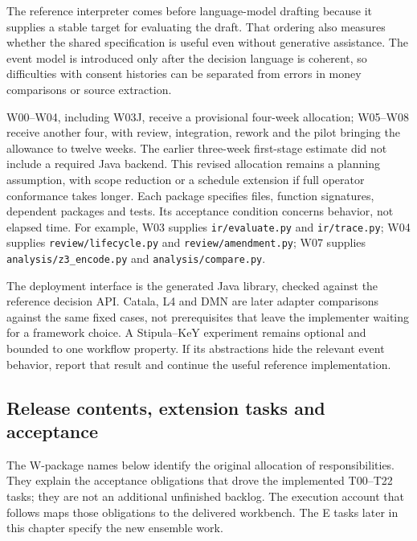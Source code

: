 The reference interpreter comes before language-model drafting because it supplies
a stable target for evaluating the draft. That ordering also measures whether the
shared specification is useful even without generative assistance. The event
model is introduced only after the decision language is coherent, so difficulties
with consent histories can be separated from errors in money comparisons or
source extraction.

W00--W04, including W03J, receive a provisional four-week allocation; W05--W08
receive another four, with review, integration, rework and the pilot bringing
the allowance to twelve weeks. The earlier three-week first-stage estimate did
not include a required Java backend. This revised allocation remains a planning
assumption, with scope reduction or a schedule extension if full operator
conformance takes longer. Each package specifies files, function signatures, dependent
packages and tests. Its acceptance condition concerns behavior, not elapsed time.
For example, W03 supplies \texttt{ir/evaluate.py} and \texttt{ir/trace.py}; W04
supplies \texttt{review/lifecycle.py} and \texttt{review/amendment.py}; W07
supplies \texttt{analysis/z3\_encode.py} and \texttt{analysis/compare.py}.

The deployment interface is the generated Java library, checked against the
reference decision API. Catala, L4 and DMN
are later adapter comparisons against the same fixed cases, not prerequisites
that leave the implementer waiting for a framework choice. A Stipula--KeY
experiment remains optional and bounded to one workflow property. If its
abstractions hide the relevant event behavior, report that result and continue
the useful reference implementation.

\subsection{Release contents, extension tasks and acceptance}

The W-package names below identify the original allocation of responsibilities.
They explain the acceptance obligations that drove the implemented T00--T22
tasks; they are not an additional unfinished backlog. The execution account that
follows maps those obligations to the delivered workbench. The E tasks later in
this chapter specify the new ensemble work.


\label{merge:P-03d-java-delivery:06}


